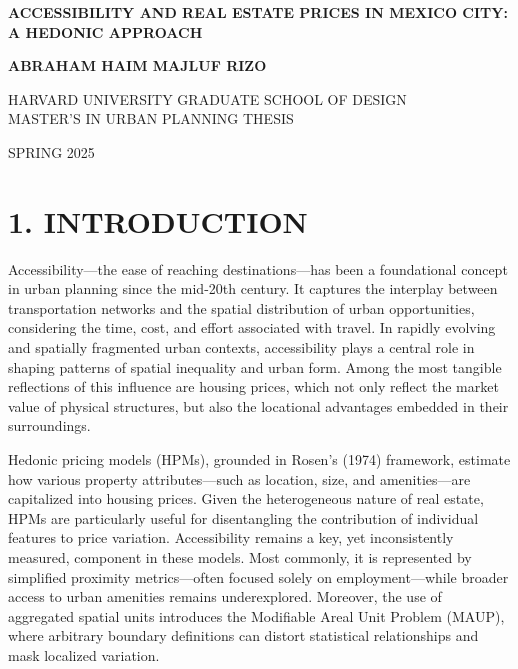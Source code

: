 \documentclass[
  12pt,
]{report}
\author{}
\date{}
\begin{document}
\begin{center}

\thispagestyle{empty}

\vspace*{2in}

\Huge \textbf{ACCESSIBILITY AND REAL ESTATE PRICES IN MEXICO CITY: A HEDONIC APPROACH}

\vspace*{2in}

\Large \textbf{ABRAHAM HAIM MAJLUF RIZO}

\vspace*{0.25in}

HARVARD UNIVERSITY GRADUATE SCHOOL OF DESIGN\\[0em]
MASTER'S IN URBAN PLANNING THESIS

\vspace*{0.25in}

SPRING 2025

\end{center}

\chapter{1. INTRODUCTION}\label{introduction}

Accessibility---the ease of reaching destinations---has been a
foundational concept in urban planning since the mid-20th century. It
captures the interplay between transportation networks and the spatial
distribution of urban opportunities, considering the time, cost, and
effort associated with travel. In rapidly evolving and spatially
fragmented urban contexts, accessibility plays a central role in shaping
patterns of spatial inequality and urban form. Among the most tangible
reflections of this influence are housing prices, which not only reflect
the market value of physical structures, but also the locational
advantages embedded in their surroundings.

Hedonic pricing models (HPMs), grounded in Rosen's (1974) framework,
estimate how various property attributes---such as location, size, and
amenities---are capitalized into housing prices. Given the heterogeneous
nature of real estate, HPMs are particularly useful for disentangling
the contribution of individual features to price variation.
Accessibility remains a key, yet inconsistently measured, component in
these models. Most commonly, it is represented by simplified proximity
metrics---often focused solely on employment---while broader access to
urban amenities remains underexplored. Moreover, the use of aggregated
spatial units introduces the Modifiable Areal Unit Problem (MAUP), where
arbitrary boundary definitions can distort statistical relationships and
mask localized variation.
\end{document}
